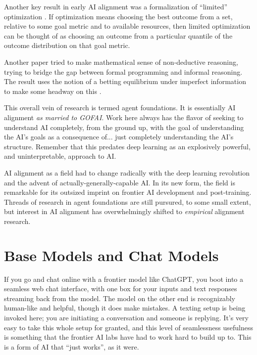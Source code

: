 Another key result in early AI alignment was a formalization of ``limited''
optimization \cite{taylor2016quantilizers}. If optimization means choosing the
best outcome from a set, relative to some goal metric and to available
resources, then limited optimization can be thought of as choosing an outcome
from a particular quantile of the outcome distribution on that goal metric.

Another paper tried to make mathematical sense of non-deductive reasoning,
trying to bridge the gap between formal programming and informal reasoning. The
result uses the notion of a betting equilibrium under imperfect information to
make some headway on this \cite{garrabrant2020induction}.

This overall vein of research is termed agent foundations. It is essentially AI
alignment \emph{as married to GOFAI}. Work here always has the flavor of
seeking to understand AI completely, from the ground up, with the goal of
understanding the AI's goals as a consequence of... just completely
understanding the AI's structure. Remember that this predates deep learning as
an explosively powerful, and uninterpretable, approach to AI.

AI alignment as a field had to change radically with the deep learning
revolution and the advent of actually-generally-capable AI. In its new form,
the field is remarkable for its outsized imprint on frontier AI development and
post-training. Threads of research in agent foundations are still pursured, to
some small extent, but interest in AI alignment has overwhelmingly shifted to
\emph{empirical} alignment research.

\section{Base Models and Chat Models}
If you go and chat online with a frontier model like ChatGPT, you boot into a
seamless web chat interface, with one box for your inputs and text responses
streaming back from the model. The model on the other end is recognizably
human-like and helpful, though it does make mistakes. A texting setup is being
invoked here; you are initiating a conversation and someone is replying. It's
very easy to take this whole setup for granted, and this level of seamlessness
usefulness is something that the frontier AI labs have had to work hard to
build up to. This is a form of AI that ``just works'', as it were.

